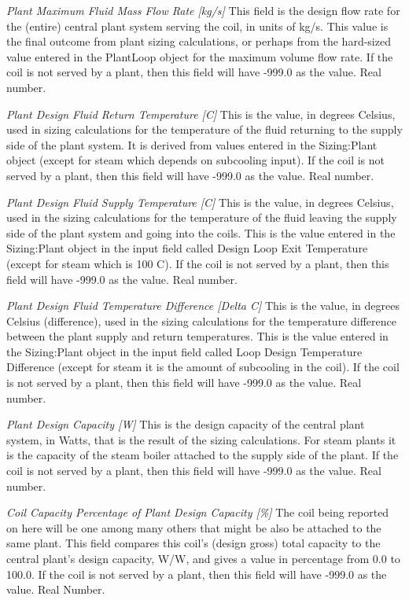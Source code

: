 \emph{Plant Maximum Fluid Mass Flow Rate [kg/s]}  This field is the design flow rate for the (entire) central plant system serving the coil, in units of kg/s.  This value is the final outcome from plant sizing calculations, or perhaps from the hard-sized value entered in the PlantLoop object for the maximum volume flow rate.  If the coil is not served by a plant, then this field will have -999.0 as the value. Real number.

\emph{Plant Design Fluid Return Temperature [C]}  This is the value, in degrees Celsius, used in sizing calculations for the temperature of the fluid returning to the supply side of the plant system.  It is derived from values entered in the Sizing:Plant object (except for steam which depends on subcooling input).  If the coil is not served by a plant, then this field will have -999.0 as the value. Real number.

\emph{Plant Design Fluid Supply Temperature [C]}  This is the value, in degrees Celsius, used in the sizing calculations for the temperature of the fluid leaving the supply side of the plant system and going into the coils.  This is the value entered in the Sizing:Plant object in the input field called Design Loop Exit Temperature (except for steam which is 100 C). If the coil is not served by a plant, then this field will have -999.0 as the value. Real number.

\emph{Plant Design Fluid Temperature Difference [Delta C]}  This is the value, in degrees Celsius (difference), used in the sizing calculations for the temperature difference between the plant supply and return temperatures.  This is the value entered in the Sizing:Plant object in the input field called Loop Design Temperature Difference (except for steam it is the amount of subcooling in the coil). If the coil is not served by a plant, then this field will have -999.0 as the value. Real number.

\emph{Plant Design Capacity [W]}  This is the design capacity of the central plant system, in Watts, that is the result of the sizing calculations.  For steam plants it is the capacity of the steam boiler attached to the supply side of the plant. If the coil is not served by a plant, then this field will have -999.0 as the value. Real number.

\emph{Coil Capacity Percentage of Plant Design Capacity [\%]}  The coil being reported on here will be one among many others that might be also be attached to the same plant.  This field compares this coil's (design gross) total capacity to the central plant's design capacity, W/W, and gives a value in percentage from 0.0 to 100.0.  If the coil is not served by a plant, then this field will have -999.0 as the value. Real Number.

